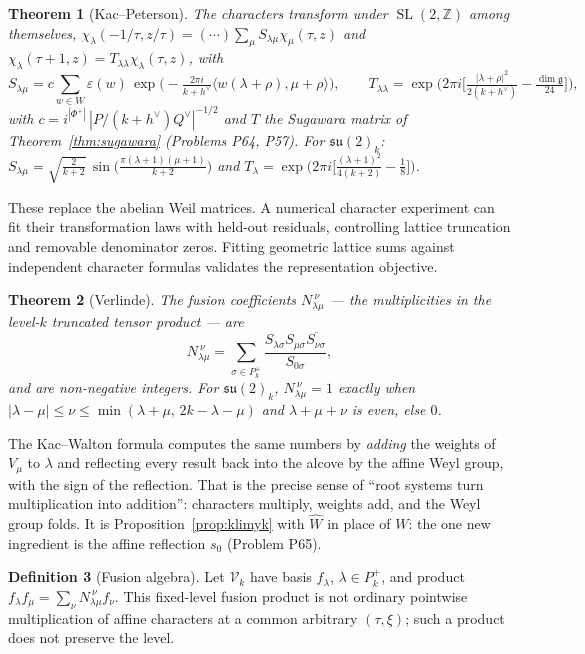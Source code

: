 \documentclass[11pt]{article}
\newtheorem{theorem}{Theorem}[section]
\theoremstyle{definition}
\newtheorem{definition}[theorem]{Definition}
\theoremstyle{remark}
\newcommand{\Z}{\mathbb{Z}}
\newcommand{\SL}{\operatorname{SL}}
\begin{document}
\begin{theorem}[Kac--Peterson]\label{thm:kp}
The characters transform under $\SL(2,\Z)$ among themselves,
$\chi_\lambda(-1/\tau, z/\tau) = (\cdots)\sum_\mu S_{\lambda\mu}\chi_\mu(\tau,z)$
and $\chi_\lambda(\tau+1,z) = T_{\lambda\lambda}\chi_\lambda(\tau,z)$, with
\[
  S_{\lambda\mu} = c\sum_{w\in W}\varepsilon(w)\,
     \exp\!\Big(-\tfrac{2\pi i}{k+h^\vee}\langle w(\lambda+\rho),\mu+\rho\rangle\Big),
  \qquad
  T_{\lambda\lambda} = \exp\!\Big(2\pi i\big[\tfrac{|\lambda+\rho|^2}{2(k+h^\vee)} - \tfrac{\dim\mathfrak g}{24}\big]\Big),
\]
with $c = i^{|\Phi^+|}\,|P/(k+h^\vee)Q^\vee|^{-1/2}$ and $T$ the Sugawara
matrix of Theorem~\ref{thm:sugawara} (Problems P64, P57).
For $\mathfrak{su}(2)_k$: $S_{\lambda\mu} = \sqrt{\tfrac{2}{k+2}}\,
\sin\!\big(\tfrac{\pi(\lambda+1)(\mu+1)}{k+2}\big)$ and
$T_\lambda = \exp\!\big(2\pi i\big[\tfrac{(\lambda+1)^2}{4(k+2)} - \tfrac18\big]\big)$.
\end{theorem}

These replace the abelian Weil matrices. A numerical character experiment
can fit their transformation laws with held-out residuals, controlling
lattice truncation and removable denominator zeros. Fitting geometric lattice sums against independent character formulas
validates the representation objective.

\begin{theorem}[Verlinde]\label{thm:verlinde}
The fusion coefficients $N_{\lambda\mu}^{\ \nu}$ --- the multiplicities in the
level-$k$ truncated tensor product --- are
\[
  N_{\lambda\mu}^{\ \nu} = \sum_{\sigma\in P_k^+}
  \frac{S_{\lambda\sigma}S_{\mu\sigma}\overline{S_{\nu\sigma}}}{S_{0\sigma}},
\]
and are non-negative integers. For $\mathfrak{su}(2)_k$,
$N_{\lambda\mu}^{\ \nu} = 1$ exactly when $|\lambda-\mu|\le\nu\le
\min(\lambda+\mu,\,2k-\lambda-\mu)$ and $\lambda+\mu+\nu$ is even, else $0$.
\end{theorem}

The Kac--Walton formula computes the same numbers by \emph{adding} the
weights of $V_\mu$ to $\lambda$ and reflecting every result back into the
alcove by the affine Weyl group, with the sign of the reflection. That is
the precise sense of ``root systems turn multiplication into addition'':
characters multiply, weights add, and the Weyl group folds. It is
Proposition~\ref{prop:klimyk} with $\hat W$ in place of $W$: the one new
ingredient is the affine reflection $s_0$ (Problem P65).

\begin{definition}[Fusion algebra]
Let $\mathcal V_k$ have basis $f_\lambda$, $\lambda\in P_k^+$, and product
$f_\lambda f_\mu=\sum_\nu N_{\lambda\mu}^{\ \nu}f_\nu$.
This fixed-level fusion product is not ordinary pointwise multiplication
of affine characters at a common arbitrary $(\tau,\xi)$; such a product
does not preserve the level.
\end{definition}
\end{document}
